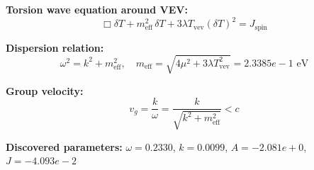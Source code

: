 
\textbf{Torsion wave equation around VEV:}
\begin{equation}
  \Box \delta T + m_{\text{eff}}^2 \, \delta T + 3\lambda T_{\text{vev}} (\delta T)^2 = J_{\text{spin}}
\end{equation}

\textbf{Dispersion relation:}
\begin{equation}
  \omega^2 = k^2 + m_{\text{eff}}^2, \quad
  m_{\text{eff}} = \sqrt{4\mu^2 + 3\lambda T_{\text{vev}}^2} = 2.3385e-1 \text{ eV}
\end{equation}

\textbf{Group velocity:}
\begin{equation}
  v_g = \frac{k}{\omega} = \frac{k}{\sqrt{k^2 + m_{\text{eff}}^2}} < c
\end{equation}

\textbf{Discovered parameters:}
$\omega = 0.2330$, \quad
$k = 0.0099$, \quad
$A = -2.081e+0$, \quad
$J = -4.093e-2$